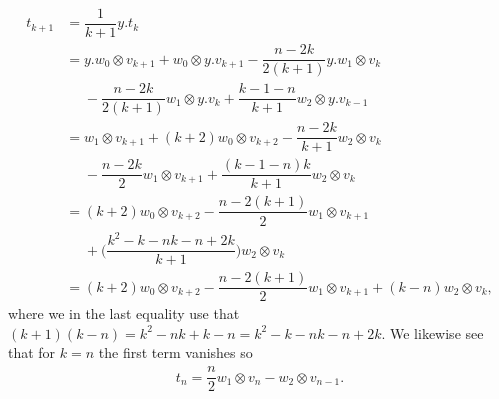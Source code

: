 \begin{align*}
  t_{k+1} &= \dfrac{1}{k+1}y.t_k \\
         &= y.w_0\otimes v_{k+1} + w_0\otimes y.v_{k+1} - \dfrac{n-2k}{2(k+1)}y.w_1\otimes v_k \\
          &\phantom{{}={}}{} - \dfrac{n-2k}{2(k+1)}w_1\otimes y.v_k + \dfrac{k-1-n}{k+1}w_2\otimes y.v_{k-1} \\
          &= w_1\otimes v_{k+1} + (k+2)w_0\otimes v_{k+2} - \dfrac{n-2k}{k+1}w_2\otimes v_k \\
          &\phantom{{}={}}{} - \dfrac{n-2k}{2}w_1\otimes v_{k+1} + \dfrac{(k-1-n)k}{k+1}w_2\otimes v_k \\
          &= (k+2)w_0\otimes v_{k+2} - \dfrac{n-2(k+1)}{2}w_1\otimes v_{k+1} \\
          &\phantom{{}={}}{} + \biggl( \dfrac{k^2-k-nk-n+2k}{k+1} \biggr) w_2\otimes v_k \\
  &= (k+2)w_0\otimes v_{k+2} - \dfrac{n-2(k+1)}{2}w_1\otimes v_{k+1} + (k-n)w_2\otimes v_k,
\end{align*}
where we in the last equality use that $(k+1)(k-n)=k^2-nk+k-n = k^2-k-nk-n+2k$. We likewise see that for $k=n$ the first term vanishes so
\begin{align*}
  t_n = \dfrac{n}{2}w_1\otimes v_n - w_2\otimes v_{n-1}.
\end{align*}

